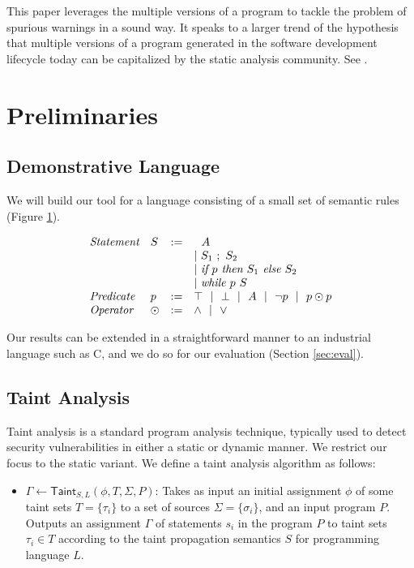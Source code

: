 \documentclass[letterpaper,twocolumn,10pt]{article}
\begin{document}
This paper leverages the multiple versions of a program to tackle the problem of spurious warnings in a sound way. It speaks to a larger trend of the hypothesis that multiple versions of a program generated in the software development lifecycle today can be capitalized by the static analysis community. See \cite{logozzo2014verification}.


\section{Preliminaries}

\subsection{Demonstrative Language}

We will build our tool for a language consisting of a small set of semantic rules (Figure \ref{fig:semrules}).

\begin{figure}
\caption{}
\label{fig:semrules}
\[
	\begin{array}{l l c l}
		\emph{Statement} & S & := & 
			\ \ A \\
			& & & |~ S_1\ ;\ S_2 \\
			& & & |~ \emph{if }p\emph{ then } S_1 \emph{ else } S_2 \\
			& & & |~ \emph{while }p\emph{ } S \\
		\emph{Predicate} & p &:=& \top ~~|~~ \bot ~~|~~ A ~~|~~ \lnot p ~~|~~ p \odot p \\
		\emph{Operator} & \odot &:=& \land ~~|~~ \lor \\
	\end{array}
\]
\end{figure}

Our results can be extended in a straightforward manner to an industrial language such as C, and we do so for our evaluation (Section \ref{sec:eval}).

\subsection{Taint Analysis}

Taint analysis is a standard program analysis technique, typically used to detect security vulnerabilities in either a static or dynamic manner. 
We restrict our focus to the static variant. We define a taint analysis algorithm as follows:

\begin{itemize}
    \item $\Gamma \gets \mathsf{Taint}_{S,L}(\phi, T, \Sigma, P)$: Takes as input an initial assignment $\phi$ of some taint sets $T = \{\tau_i\}$ to 
    a set of sources $\Sigma = \{\sigma_i\}$, and an input program $P$. Outputs an 
    assignment $\Gamma$ of statements $s_i$ in the program $P$ to taint sets $\tau_i \in T$ according to the taint propagation semantics $S$ for programming
    language $L$.
\end{itemize}
\end{document}

